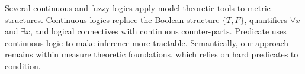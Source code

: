 Several continuous \cite{levin2000continuous} and fuzzy \cite{klir1995fuzzy} logics apply model-theoretic tools to metric structures.
Continuous logics replace the Boolean structure $\{T, F\}$, quantifiers $\forall x$ and $\exists x$, and logical connectives with continuous counter-parts.
Predicate uses continuous logic to make inference more tractable. Semantically, our approach remains within measure theoretic foundations, which relies on hard predicates to condition.



